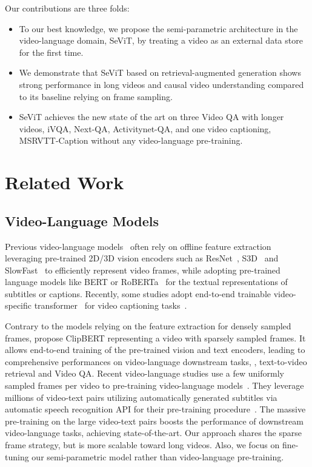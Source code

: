 \documentclass{article}
\newcommand{\frameworkname}{SeViT}
\begin{document}
Our contributions are three folds:
\begin{itemize}

\item To our best knowledge, we propose the semi-parametric architecture in the video-language domain, \frameworkname{}, by treating a video as an external data store for the first time.


\item We demonstrate that \frameworkname{} based on retrieval-augmented generation shows strong performance in long videos and causal video understanding compared to its baseline relying on frame sampling.

\item \frameworkname{} achieves the new state of the art on three Video QA with longer videos, iVQA, Next-QA, Activitynet-QA, and one video captioning, MSRVTT-Caption without any video-language pre-training.
\end{itemize} \section{Related Work}

\subsection{Video-Language Models}
Previous video-language models~\cite{sun2019videobert, li2020hero, yang2021just} often rely on offline feature extraction leveraging pre-trained 2D/3D vision encoders such as ResNet~\cite{he2016deep}, S3D~\cite{xie2018rethinking} and SlowFast~\cite{feichtenhofer2019slowfast} to efficiently represent video frames, while adopting pre-trained language models like BERT or RoBERTa~\cite{devlin2019bert, liu2019roberta} for the textual representations of subtitles or captions. Recently, some studies adopt end-to-end trainable video-specific transformer~\cite{liu2022video,arnab2021vivit} for video captioning tasks~\cite{lin2022swinbert, seo2022end}.

Contrary to the models relying on the feature extraction for densely sampled frames, \citet{lei2021less} propose ClipBERT representing a video with sparsely sampled frames. It allows end-to-end training of the pre-trained vision and text encoders, leading to comprehensive performances on video-language downstream tasks, \ie, text-to-video retrieval and Video QA.
Recent video-language studies use a few uniformly sampled frames per video to pre-training video-language models~\cite{zellers2021merlot, wang2022all, zellers2022merlot, yang2022zero}. They leverage millions of video-text pairs utilizing automatically generated subtitles via automatic speech recognition API for their pre-training procedure~\cite{miech2019howto100m, bain2021frozen}. The massive pre-training on the large video-text pairs boosts the performance of downstream video-language tasks, achieving state-of-the-art. Our approach shares the sparse frame strategy, but is more scalable toward long videos. Also, we focus on fine-tuning our semi-parametric model rather than video-language pre-training.
\end{document}
